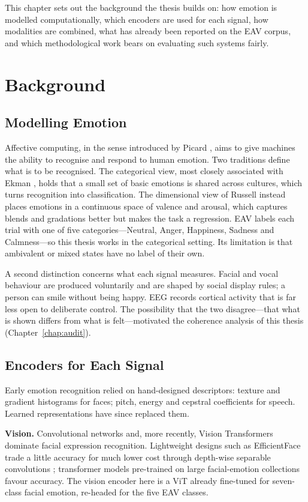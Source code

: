 This chapter sets out the background the thesis builds on: how emotion is modelled computationally, which encoders are used for each signal, how modalities are combined, what has already been reported on the EAV corpus, and which methodological work bears on evaluating such systems fairly.

\section{Background}

\subsection{Modelling Emotion}
Affective computing, in the sense introduced by Picard \cite{Picard1997AffectiveComputing}, aims to give machines the ability to recognise and respond to human emotion. Two traditions define what is to be recognised. The categorical view, most closely associated with Ekman \cite{Ekman1992Argument}, holds that a small set of basic emotions is shared across cultures, which turns recognition into classification. The dimensional view of Russell \cite{Russell1980Circumplex} instead places emotions in a continuous space of valence and arousal, which captures blends and gradations better but makes the task a regression. EAV labels each trial with one of five categories---Neutral, Anger, Happiness, Sadness and Calmness---so this thesis works in the categorical setting. Its limitation is that ambivalent or mixed states have no label of their own.

A second distinction concerns what each signal measures. Facial and vocal behaviour are produced voluntarily and are shaped by social display rules; a person can smile without being happy. EEG records cortical activity that is far less open to deliberate control. The possibility that the two disagree---that what is shown differs from what is felt---motivated the coherence analysis of this thesis (Chapter~\ref{chap:audit}).

\subsection{Encoders for Each Signal}
Early emotion recognition relied on hand-designed descriptors: texture and gradient histograms for faces; pitch, energy and cepstral coefficients for speech. Learned representations have since replaced them.

\textbf{Vision.} Convolutional networks and, more recently, Vision Transformers \cite{Dosovitskiy2021ViT} dominate facial expression recognition. Lightweight designs such as EfficientFace trade a little accuracy for much lower cost through depth-wise separable convolutions \cite{Zhao2021LightweightFER}; transformer models pre-trained on large facial-emotion collections favour accuracy. The vision encoder here is a ViT already fine-tuned for seven-class facial emotion, re-headed for the five EAV classes.

